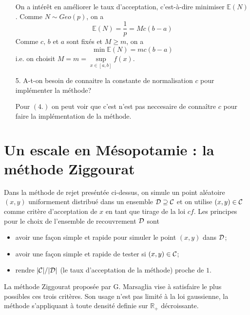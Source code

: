\documentclass[a4paper]{article}
\begin{document}
\begin{enumerate}
On a int\'er\^et en am\'eliorer le taux d'acceptation, c'est-\`a-dire minimiser $\mathbb{E}(N)$. Comme $N\sim Geo(p)$, on a 
$$\mathbb{E}(N) = \frac{1}{p} = Mc(b-a)$$
Comme $c,\,b$ et $a$ sont fix\'es et $M\geq m$, on a
$$\min \mathbb{E}(N) = mc(b-a)$$
i.e. on choisit $M=m = \sup\limits_{x\in[a,b]}f(x)$.

\item[5.] A-t-on besoin de connaitre la constante de normalisation $c$ pour impl\'ementer la m\'ethode?

Pour $(4.)$ on peut voir que c'est n'est pas neccesaire de conna\^itre $c$ pour faire la impl\'ementation de la m\'ethode.

\end{enumerate}

\section{Un escale en M\'esopotamie : la m\'ethode Ziggourat}

Dans la m\'ethode de rejet pres\'ent\'ee ci-dessus, on simule un point al\'eatoire $(x,y)$ uniformement distribu\'e dans un ensemble ${\cal D}\supseteq {\cal C}$ et on utilise $(x,y)\in{\cal C}$ comme crit\`ere d'acceptation de $x$ en tant que tirage de la loi $cf$. Les principes pour le choix de l'ensemble de recouvrement ${\cal D}$ sont
\begin{itemize}
\item avoir une fa\c{c}on simple et rapide pour simuler le point $(x,y)$ dans ${\cal D}$;
\item avoir une fa\c{c}on simple et rapide de tester si $(x,y)\in{\cal C}$;
\item rendre $|{\cal C}|/|{\cal D}|$ (le taux d'acceptation de la m\'ethode) proche de $1$.
\end{itemize}
La m\'ethode Ziggourat propos\'ee par G. Marsaglia vise \`a satisfaire le plus possibles ces trois crit\`eres. Son usage n'est pas limit\'e \`a la loi gaussienne, la m\'ethode s'appliquant \`a toute densit\'e definie sur $\mathbb{R}_+$ d\'ecroissante.
\end{document}
